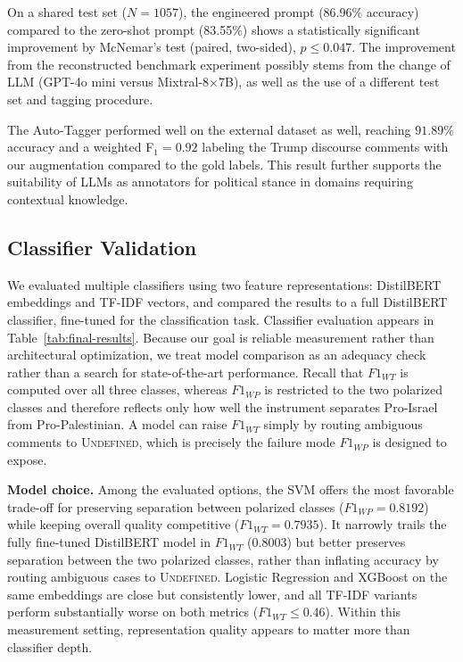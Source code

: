 \documentclass[letterpaper]{article} %
\begin{document}
On a shared test set ($N=1057$), the engineered prompt (86.96\% accuracy) compared to the zero-shot prompt (83.55\%) shows a statistically significant improvement by McNemar’s test (paired, two-sided), $p \leq 0.047$. The improvement from the reconstructed benchmark experiment possibly stems from the change of LLM (GPT-4o mini versus Mixtral-8$\times$7B), as well as the use of a different test set and tagging procedure.

The Auto-Tagger performed well on the external dataset as well, reaching $91.89\%$ accuracy and a weighted F$_{1}=0.92$ labeling the Trump discourse comments with our augmentation compared to the gold labels. This result further supports the suitability of LLMs as annotators for political stance in domains requiring contextual knowledge.

\subsection{Classifier Validation}

We evaluated multiple classifiers using two feature representations: DistilBERT embeddings and TF-IDF vectors, and compared the results to a full DistilBERT classifier, fine-tuned for the classification task. Classifier evaluation appears in Table~\ref{tab:final-results}. Because our goal is reliable measurement rather than architectural optimization, we treat model comparison as an adequacy check rather than a search for state-of-the-art performance. Recall that \(F1_{WT}\) is computed over all three classes, whereas \(F1_{WP}\) is restricted to the two polarized classes and therefore reflects only how well the instrument separates Pro-Israel from Pro-Palestinian. A model can raise \(F1_{WT}\) simply by routing ambiguous comments to \textsc{Undefined}, which is precisely the failure mode \(F1_{WP}\) is designed to expose.

\noindent\textbf{Model choice.} Among the evaluated options, the SVM offers the most favorable trade-off for preserving separation between polarized classes (\(F1_{WP}=0.8192\)) while keeping overall quality competitive (\(F1_{WT}=0.7935\)). It narrowly trails the fully fine-tuned DistilBERT model in \(F1_{WT}\) (0.8003) but better preserves separation between the two polarized classes, rather than inflating accuracy by routing ambiguous cases to \textsc{Undefined}. Logistic Regression and XGBoost on the same embeddings are close but consistently lower, and all TF-IDF variants perform substantially worse on both metrics (\(F1_{WT}\le 0.46\)). Within this measurement setting, representation quality appears to matter more than classifier depth. 
\end{document}
